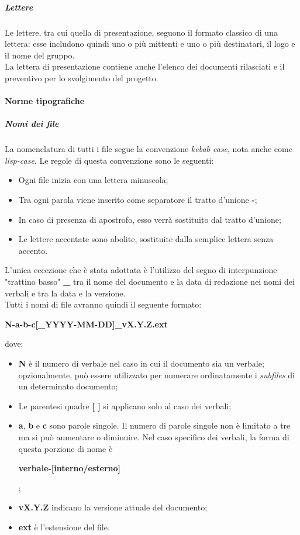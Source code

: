 \documentclass[../norme-di-progetto.tex]{subfiles}
\begin{document}
\subparagraph{Lettere}
Le lettere, tra cui quella di presentazione, seguono il formato classico di una lettera: esse includono quindi uno o più mittenti e uno o più destinatari, il logo e il nome del gruppo. \\
La lettera di presentazione contiene anche l'elenco dei documenti rilasciati e il preventivo per lo svolgimento del progetto.

\paragraph{Norme tipografiche}
\subparagraph{Nomi dei file}
La nomenclatura di tutti i file segue la convenzione \textit{kebab case}, nota anche come \textit{lisp-case}. Le regole di questa convenzione sono le seguenti:
\begin{itemize}
  \item Ogni file inizia con una lettera minuscola;
  \item Tra ogni parola viene inserito come separatore il tratto d'unione \textbf{-};
  \item In caso di presenza di apostrofo, esso verrà sostituito dal tratto d'unione;
  \item Le lettere accentate sono abolite, sostituite dalla semplice lettera senza accento.
\end{itemize}
L'unica eccezione che è stata adottata è l'utilizzo del segno di interpunzione "trattino basso" \textbf{\_} tra il nome del documento e la data di redazione nei nomi dei verbali e tra la data e la versione. \\
Tutti i nomi di file avranno quindi il seguente formato: \\ \begin{center}
  \centering
  \textbf{N-a-b-c[\_YYYY-MM-DD]\_vX.Y.Z.ext}
\end{center} dove:
\begin{itemize}
  \item \textbf{N} è il numero di verbale nel caso in cui il documento sia un verbale; opzionalmente, può essere utilizzato per numerare ordinatamente i \textit{subfiles} di un determinato documento;
  \item Le parentesi quadre \textbf{[ ]} si applicano solo al caso dei verbali;
  \item \textbf{a}, \textbf{b} e \textbf{c} sono parole singole. Il numero di parole singole non è limitato a tre ma si può aumentare o diminuire. Nel caso specifico dei verbali, la forma di questa porzione di nome è \begin{center}
    \centering
    \textbf{verbale-[interno/esterno]}
  \end{center};
  \item \textbf{vX.Y.Z} indicano la versione attuale del documento;
  \item \textbf{ext} è l'estensione del file.
\end{itemize}
\end{document}

